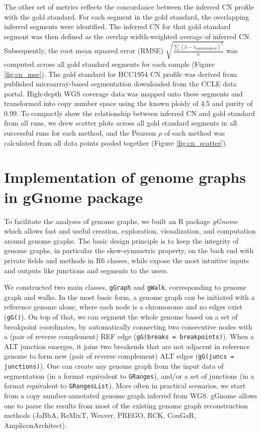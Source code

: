 \documentclass[phd,tocprelim]{cornell}
\begin{document}
The other set of metrics reflects the concordance between the inferred CN profile with the gold standard. For each segment in the gold standard, the overlapping inferred segments were identified. The inferred CN for that gold standard segment was then defined as the overlap width-weighted average of inferred CN. Subsequently, the root mean squared error (RMSE) $\sqrt{\frac{\sum{(\hat{x} - x_{goldstandard})^2}}{n}}$ was computed across all gold standard segments for each sample (Figure \ref{fig:cn_mse}). The gold standard for HCC1954 CN profile was derived from published microarray-based segmentation downloaded from the CCLE data portal. High-depth WGS coverage data was mapped onto these segments and transformed into copy number space using the known ploidy of 4.5 and purity of 0.99. To compactly show the relationship between inferred CN and gold standard from all runs, we drew scatter plots across all gold standard segments in all successful runs for each method, and the Pearson $\rho$ of each method was calculated from all data points pooled together (Figure \ref{fig:cn_scatter}).

\section{Implementation of genome graphs in gGnome package} \label{sec:implement_ggnome}
To facilitate the analyses of genome graphs, we built an R package \textit{gGnome} which allows fast and useful creation, exploration, visualization, and computation around genome graphs. The basic design principle is to keep the integrity of genome graphs, in particular the skew-symmetric property, on the back end with private fields and methods in R6 classes, while expose the most intuitive inputs and outputs like junctions and segments to the users.

We constructed two main classes, \texttt{gGraph} and \texttt{gWalk}, corresponding to genome graph and walks. In the most basic form, a genome graph can be initiated with a reference genome alone, where each node is a chromosome and no edges exist (\texttt{gG()}). On top of that, we can segment the whole genome based on a set of breakpoint coordinates, by automatically connecting two consecutive nodes with a (pair of reverse complement) REF edge (\texttt{gG(breaks = breakpoints)}). When a ALT junction emerges, it joins two breakends that are not adjacent in reference genome to form new (pair of reverse complement) ALT edges (\texttt{gG(juncs = junctions)}). One can create any genome graph from the input data of segmentation (in a format equivalent to \texttt{GRanges}), and/or a set of junctions (in a format equivalent to \texttt{GRangesList}). More often in practical scenarios, we start from a copy number-annotated genome graph inferred from WGS. gGnome allows one to parse the results from most of the existing genome graph reconstruction methods (JaBbA, ReMixT, Weaver, PREGO, RCK, CouGaR, AmpliconArchitect).
\end{document}
